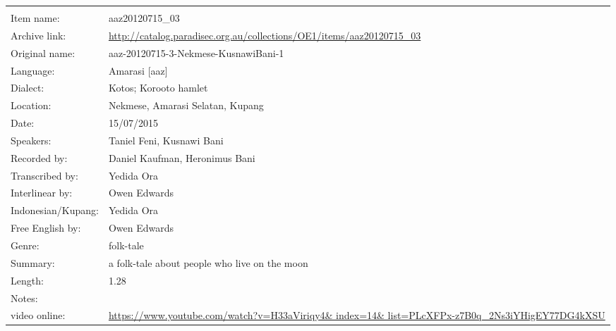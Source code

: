 \newpage
\noindent
\wg\begin{tabular}{lL{.67\textwidth}}
			& \\
Item name:			& aaz20120715{\_}03\\
Archive link:			& \url{http://catalog.paradisec.org.au/collections/OE1/items/aaz20120715_03}\\
Original name:			& aaz-20120715-3-Nekmese-KusnawiBani-1\\
Language:				& Amarasi [aaz] \\
Dialect:				& Kotos; Koro{\Q}oto hamlet \\
Location:				& Nekmese{\Q}, Amarasi Selatan, Kupang \\
Date:				& 15/07/2015 \\
Speakers:				& Taniel Feni, Kusnawi Bani\\
Recorded by:			& Daniel Kaufman, Heronimus Bani\\
Transcribed by:		& Yedida Ora\\
Interlinear by:		& Owen Edwards \\
Indonesian/Kupang:		& Yedida Ora\\
Free English by:		& Owen Edwards\\
Genre:				& folk-tale\\
Summary:				& a folk-tale about people who live on the moon\\
Length:				& 1.28\\
Notes:				& \\
video online: & \url{https://www.youtube.com/watch?v=H33aViriqy4& index=14& list=PLcXFPx-z7B0q_2Ns3iYHigEY77DG4kXSU}\\
\end{tabular}

